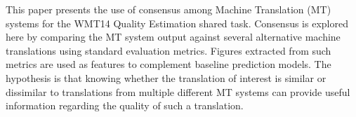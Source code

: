 This paper presents the use of consensus among Machine Translation (MT) systems for the WMT14 Quality Estimation shared task. Consensus is explored here by comparing the MT system output against several alternative machine translations using standard evaluation metrics. Figures extracted from such metrics are used as features to complement baseline prediction models. The hypothesis is that knowing whether the translation of interest is similar or dissimilar to translations from multiple different MT systems can provide useful information regarding the quality of such a translation.
